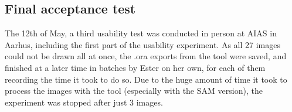 \subsection{Final acceptance test}

The 12th of May, a third usability test was conducted in person at AIAS in Aarhus, including the first part of the usability experiment.
As all 27 images could not be drawn all at once, the .ora exports from the tool were saved, and finished at a later time in batches by Ester on her own, for each of them recording the time it took to do so.
Due to the huge amount of time it took to process the images with the tool (especially with the \acs{SAM} version), the experiment was stopped after just 3 images.
